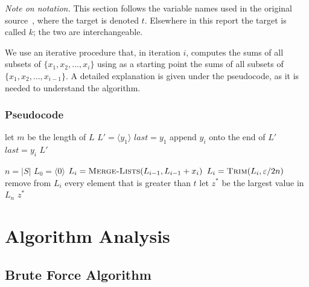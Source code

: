\documentclass[12pt,a4paper]{article}
\theoremstyle{definition}
\begin{document}
\noindent\textit{Note on notation.} This section follows the variable names used
in the original source~\cite{clrs}, where the target is denoted $t$. Elsewhere
in this report the target is called $k$; the two are interchangeable.

We use an iterative procedure that, in iteration $i$, computes the sums of all subsets
of $\{x_1, x_2, \ldots, x_i\}$ using as a starting point the sums of all subsets of
$\{x_1, x_2, \ldots, x_{i-1}\}$. A detailed explanation is given under the pseudocode,
as it is needed to understand the algorithm.

\subsubsection{Pseudocode}

\begin{algorithm}[H]
\caption{\textsc{Trim}$(L, \delta)$}
\begin{algorithmic}[1]
\State let $m$ be the length of $L$
\State $L' = \langle y_1 \rangle$
\State $last = y_1$
     
        \State append $y_i$ onto the end of $L'$
        \State $last = y_i$
    \EndIf
\EndFor
\State \Return $L'$
\end{algorithmic}
\end{algorithm}

\begin{algorithm}[H]
\caption{\textsc{Approx-Subset-Sum}$(S,t,\varepsilon)$}
\begin{algorithmic}[1]
\State $n = |S|$
\State $L_0 = \langle 0 \rangle$
    \State $L_i = \textsc{Merge-Lists}(L_{i-1}, L_{i-1} + x_i)$
    \State $L_i = \textsc{Trim}(L_i, \varepsilon/2n)$
    \State remove from $L_i$ every element that is greater than $t$
\EndFor
\State let $z^*$ be the largest value in $L_n$
\State \Return $z^*$
\end{algorithmic}
\end{algorithm}

\section{Algorithm Analysis}

\subsection{Brute Force Algorithm}
\end{document}

